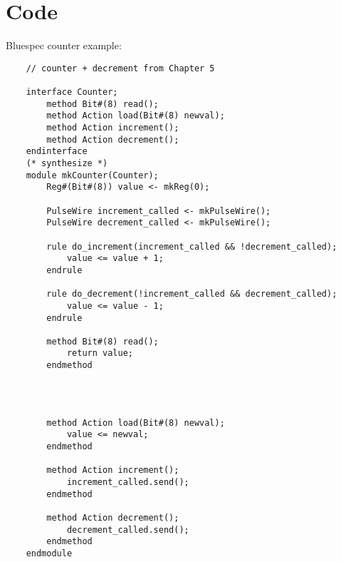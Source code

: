 
\chapter{Code}

Bluespec counter example:

\begin{listing}[ht]
    \begin{verbatim}
    // counter + decrement from Chapter 5

    interface Counter;
        method Bit#(8) read();
        method Action load(Bit#(8) newval);
        method Action increment();
        method Action decrement();
    endinterface
    (* synthesize *)
    module mkCounter(Counter);
        Reg#(Bit#(8)) value <- mkReg(0);

        PulseWire increment_called <- mkPulseWire();
        PulseWire decrement_called <- mkPulseWire();

        rule do_increment(increment_called && !decrement_called);
            value <= value + 1;
        endrule

        rule do_decrement(!increment_called && decrement_called);
            value <= value - 1;
        endrule

        method Bit#(8) read();
            return value;
        endmethod

    
    \end{verbatim}
\end{listing}

\begin{listing}[ht]
    \begin{verbatim}

        method Action load(Bit#(8) newval);
            value <= newval;
        endmethod

        method Action increment();
            increment_called.send();
        endmethod

        method Action decrement();
            decrement_called.send();
        endmethod
    endmodule
    
    \end{verbatim}
    \caption[Caption for LOF]%
    {A counter implementation in Bluespec~\cite{bluespec}}
    \label{listing:bluespec}
\end{listing}

